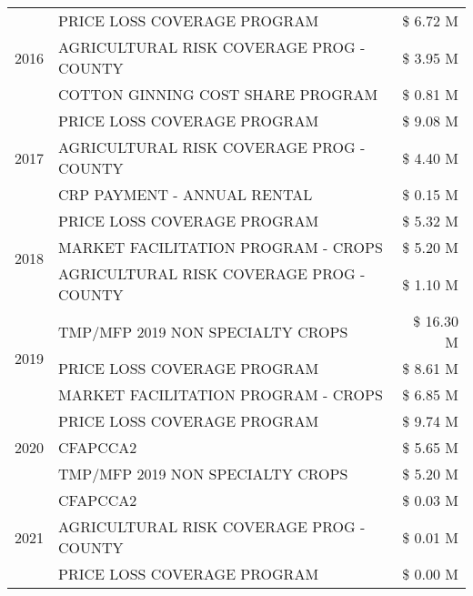 \begin{tabular}{llr}
\multirow[t]{3}{*}{2016} & PRICE LOSS COVERAGE PROGRAM                   & \$ 6.72 M \\
 & AGRICULTURAL RISK COVERAGE PROG - COUNTY      & \$ 3.95 M \\
 & COTTON GINNING COST SHARE PROGRAM             & \$ 0.81 M \\
\cline{1-3}
\multirow[t]{3}{*}{2017} & PRICE LOSS COVERAGE PROGRAM & \$ 9.08 M \\
 & AGRICULTURAL RISK COVERAGE PROG - COUNTY & \$ 4.40 M \\
 & CRP PAYMENT - ANNUAL RENTAL & \$ 0.15 M \\
\cline{1-3}
\multirow[t]{3}{*}{2018} & PRICE LOSS COVERAGE PROGRAM & \$ 5.32 M \\
 & MARKET FACILITATION PROGRAM - CROPS & \$ 5.20 M \\
 & AGRICULTURAL RISK COVERAGE PROG - COUNTY & \$ 1.10 M \\
\cline{1-3}
\multirow[t]{3}{*}{2019} & TMP/MFP 2019 NON SPECIALTY CROPS & \$ 16.30 M \\
 & PRICE LOSS COVERAGE PROGRAM & \$ 8.61 M \\
 & MARKET FACILITATION PROGRAM - CROPS & \$ 6.85 M \\
\cline{1-3}
\multirow[t]{3}{*}{2020} & PRICE LOSS COVERAGE PROGRAM & \$ 9.74 M \\
 & CFAPCCA2 & \$ 5.65 M \\
 & TMP/MFP 2019 NON SPECIALTY CROPS & \$ 5.20 M \\
\cline{1-3}
\multirow[t]{3}{*}{2021} & CFAPCCA2 & \$ 0.03 M \\
 & AGRICULTURAL RISK COVERAGE PROG - COUNTY & \$ 0.01 M \\
 & PRICE LOSS COVERAGE PROGRAM & \$ 0.00 M \\
\cline{1-3}
\bottomrule
\end{tabular}
